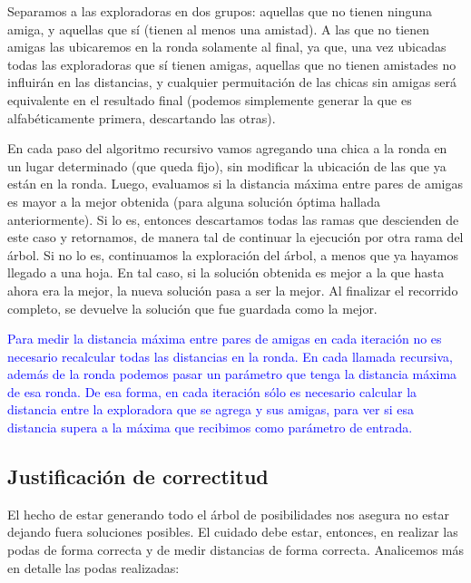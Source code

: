 Separamos a las exploradoras en dos grupos: aquellas que no tienen ninguna amiga, y aquellas que sí (tienen al menos una amistad). A las que no tienen amigas las ubicaremos en la ronda solamente al final, ya que, una vez ubicadas todas las exploradoras que sí tienen amigas, aquellas que no tienen amistades no influirán en las distancias, y cualquier permuitación de las chicas sin amigas será equivalente en el resultado final (podemos simplemente generar la que es alfabéticamente primera, descartando las otras).

En cada paso del algoritmo recursivo vamos agregando una chica a la ronda en un lugar determinado (que queda fijo), sin modificar la ubicación de las que ya están en la ronda. Luego, evaluamos si la distancia máxima entre pares de amigas es mayor a la mejor obtenida (para alguna solución óptima hallada anteriormente). Si lo es, entonces descartamos todas las ramas que descienden de este caso y retornamos, de manera tal de continuar la ejecución por otra rama del árbol. Si no lo es, continuamos la exploración del árbol, a menos que ya hayamos llegado a una hoja. En tal caso, si la solución obtenida es mejor a la que hasta ahora era la mejor, la nueva solución pasa a ser la mejor. Al finalizar el recorrido completo, se devuelve la solución que fue guardada como la mejor.

{\large \textcolor{blue}{Para medir la distancia máxima entre pares de amigas en cada iteración no es necesario recalcular todas las distancias en la ronda. En cada llamada recursiva, además de la ronda podemos pasar un parámetro que tenga la distancia máxima de esa ronda. De esa forma, en cada iteración sólo es necesario calcular la distancia entre la exploradora que se agrega y sus amigas, para ver si esa distancia supera a la máxima que recibimos como parámetro de entrada.}}



\subsection{Justificación de correctitud}

El hecho de estar generando todo el árbol de posibilidades nos asegura no estar dejando fuera soluciones posibles. El cuidado debe estar, entonces, en realizar las podas de forma correcta y de medir distancias de forma correcta. Analicemos más en detalle las podas realizadas:

